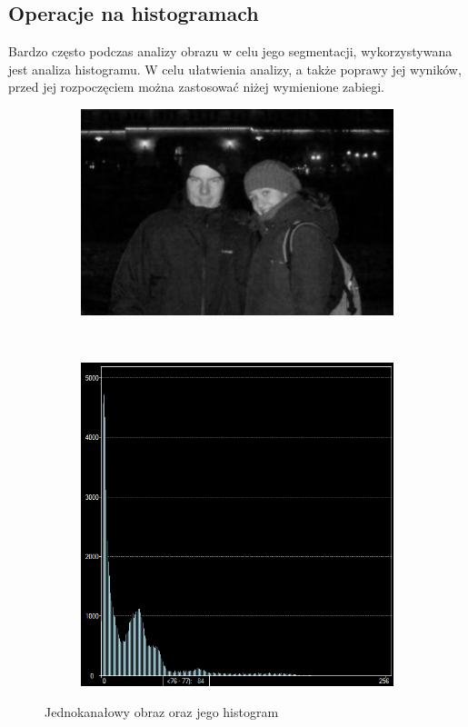 \subsection{Operacje na histogramach}
Bardzo często podczas analizy obrazu w celu jego segmentacji, wykorzystywana jest analiza histogramu. W celu ułatwienia analizy, a także poprawy jej wyników, przed jej rozpoczęciem można zastosować niżej wymienione zabiegi.
\begin{figure}
  \centering
  \begin{subfigure}[b]{0.45\textwidth}
    \includegraphics[width=\textwidth]{img/image-histogram}
    \label{fig:image_histogram}
  \end{subfigure}
  ~
  \begin{subfigure}[b]{0.45\textwidth}
    \includegraphics[width=\textwidth]{img/image-histogram-histogram}
    \label{fig:image_histogram_histogram}
  \end{subfigure}
  \caption{Jednokanałowy obraz oraz jego histogram}
  \label{fig:image_histogram_g}
\end{figure}
